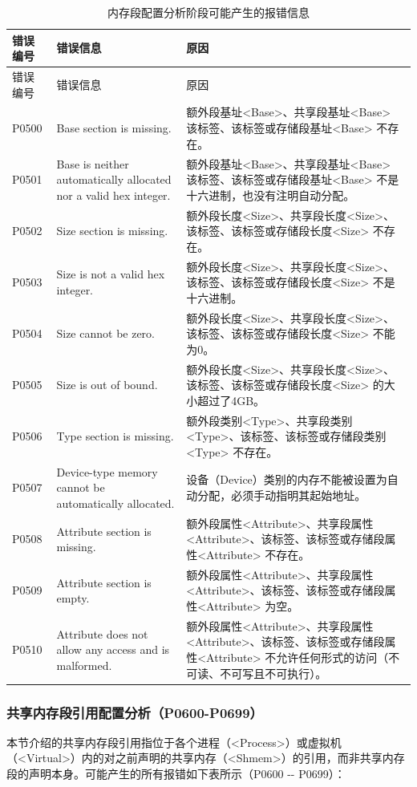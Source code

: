 \begin{xltabular}{\textwidth}{@{}>{\hsize\raggedright\arraybackslash}X>{\hsize\raggedright\arraybackslash}X>{\hsize\raggedright\arraybackslash}X@{}}
\caption{内存段配置分析阶段可能产生的报错信息}\label{tab:5-8}\\
\toprule
错误编号 & 错误信息 & 原因\tabularnewline
\endfirsthead
\toprule
错误编号 & 错误信息 & 原因\tabularnewline
\midrule
\endhead
\bottomrule
\endlastfoot
P0500 & Base section is missing. &
额外段基址<Base>、共享段基址<Base> 该标签、该标签或存储段基址<Base> 不存在。\tabularnewline
P0501 & Base is neither automatically allocated nor a valid hex integer.
&
额外段基址<Base>、共享段基址<Base> 该标签、该标签或存储段基址<Base> 不是十六进制，也没有注明自动分配。\tabularnewline
P0502 & Size section is missing. &
额外段长度<Size>、共享段长度<Size>、该标签、该标签或存储段长度<Size> 不存在。\tabularnewline
P0503 & Size is not a valid hex integer. &
额外段长度<Size>、共享段长度<Size>、该标签、该标签或存储段长度<Size> 不是十六进制。\tabularnewline
P0504 & Size cannot be zero. &
额外段长度<Size>、共享段长度<Size>、该标签、该标签或存储段长度<Size> 不能为0。\tabularnewline
P0505 & Size is out of bound. &
额外段长度<Size>、共享段长度<Size>、该标签、该标签或存储段长度<Size> 的大小超过了4GB。\tabularnewline
P0506 & Type section is missing. &
额外段类别<Type>、共享段类别<Type>、该标签、该标签或存储段类别<Type> 不存在。\tabularnewline
P0507 & Device-type memory cannot be automatically allocated. &
设备（Device）类别的内存不能被设置为自动分配，必须手动指明其起始地址。\tabularnewline
P0508 & Attribute section is missing. &
额外段属性<Attribute>、共享段属性<Attribute>、该标签、该标签或存储段属性<Attribute> 不存在。\tabularnewline
P0509 & Attribute section is empty. &
额外段属性<Attribute>、共享段属性<Attribute>、该标签、该标签或存储段属性<Attribute> 为空。\tabularnewline
P0510 & Attribute does not allow any access and is malformed. &
额外段属性<Attribute>、共享段属性<Attribute>、该标签、该标签或存储段属性<Attribute> 不允许任何形式的访问（不可读、不可写且不可执行）。\tabularnewline
\end{xltabular}

\subsubsection{共享内存段引用配置分析（P0600-P0699）}\label{subsubsec:5-6-2-7}

本节介绍的共享内存段引用指位于各个进程（<Process>）或虚拟机（<Virtual>）内的对之前声明的共享内存（<Shmem>）的引用，而非共享内存段的声明本身。可能产生的所有报错如下表所示（P0600
-\/- P0699）：

